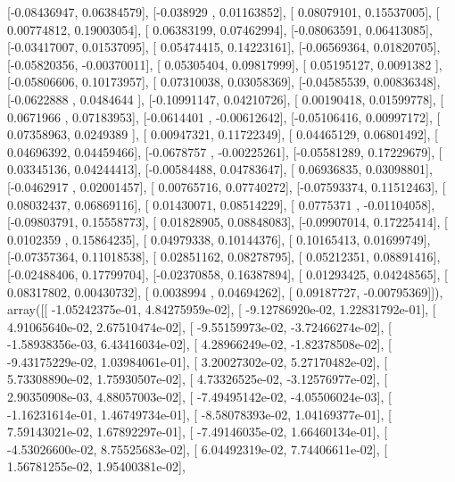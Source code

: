 \documentclass{article}
\begin{document}
       [-0.08436947,  0.06384579],
       [-0.038929  ,  0.01163852],
       [ 0.08079101,  0.15537005],
       [ 0.00774812,  0.19003054],
       [ 0.06383199,  0.07462994],
       [-0.08063591,  0.06413085],
       [-0.03417007,  0.01537095],
       [ 0.05474415,  0.14223161],
       [-0.06569364,  0.01820705],
       [-0.05820356, -0.00370011],
       [ 0.05305404,  0.09817999],
       [ 0.05195127,  0.0091382 ],
       [-0.05806606,  0.10173957],
       [ 0.07310038,  0.03058369],
       [-0.04585539,  0.00836348],
       [-0.0622888 ,  0.0484644 ],
       [-0.10991147,  0.04210726],
       [ 0.00190418,  0.01599778],
       [ 0.0671966 ,  0.07183953],
       [-0.0614401 , -0.00612642],
       [-0.05106416,  0.00997172],
       [ 0.07358963,  0.0249389 ],
       [ 0.00947321,  0.11722349],
       [ 0.04465129,  0.06801492],
       [ 0.04696392,  0.04459466],
       [-0.0678757 , -0.00225261],
       [-0.05581289,  0.17229679],
       [ 0.03345136,  0.04244413],
       [-0.00584488,  0.04783647],
       [ 0.06936835,  0.03098801],
       [-0.0462917 ,  0.02001457],
       [ 0.00765716,  0.07740272],
       [-0.07593374,  0.11512463],
       [ 0.08032437,  0.06869116],
       [ 0.01430071,  0.08514229],
       [ 0.0775371 , -0.01104058],
       [-0.09803791,  0.15558773],
       [ 0.01828905,  0.08848083],
       [-0.09907014,  0.17225414],
       [ 0.0102359 ,  0.15864235],
       [ 0.04979338,  0.10144376],
       [ 0.10165413,  0.01699749],
       [-0.07357364,  0.11018538],
       [ 0.02851162,  0.08278795],
       [ 0.05212351,  0.08891416],
       [-0.02488406,  0.17799704],
       [-0.02370858,  0.16387894],
       [ 0.01293425,  0.04248565],
       [ 0.08317802,  0.00430732],
       [ 0.0038994 ,  0.04694262],
       [ 0.09187727, -0.00795369]]), array([[ -1.05242375e-01,   4.84275959e-02],
       [ -9.12786920e-02,   1.22831792e-01],
       [  4.91065640e-02,   2.67510474e-02],
       [ -9.55159973e-02,  -3.72466274e-02],
       [ -1.58938356e-03,   6.43416034e-02],
       [  4.28966249e-02,  -1.82378508e-02],
       [ -9.43175229e-02,   1.03984061e-01],
       [  3.20027302e-02,   5.27170482e-02],
       [  5.73308890e-02,   1.75930507e-02],
       [  4.73326525e-02,  -3.12576977e-02],
       [  2.90350908e-03,   4.88057003e-02],
       [ -7.49495142e-02,  -4.05506024e-03],
       [ -1.16231614e-01,   1.46749734e-01],
       [ -8.58078393e-02,   1.04169377e-01],
       [  7.59143021e-02,   1.67892297e-01],
       [ -7.49146035e-02,   1.66460134e-01],
       [ -4.53026600e-02,   8.75525683e-02],
       [  6.04492319e-02,   7.74406611e-02],
       [  1.56781255e-02,   1.95400381e-02],
\end{document}
